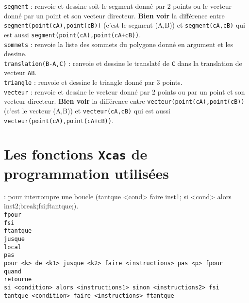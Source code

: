 \documentclass[12pt,a4paper]{book}
\begin{document}
\begin{giacjshere}
{\tt segment}  : renvoie et dessine soit le segment donn\'e par 2 points ou 
le vecteur donn\'e par un point et son vecteur directeur. {\bf Bien voir} la 
diff\'erence entre {\tt segment(point(cA),point(cB))} (c'est le segment (A,B)) 
et {\tt segment(cA,cB)} qui est aussi {\tt segment(point(cA),point(cA+cB))}.\\
{\tt sommets} : renvoie la liste des sommets du polygone donn\'e en argument et les dessine.\\ 
{\tt translation(B-A,C)} : renvoie et dessine le translat\'e de {\tt C} dans la 
translation de vecteur {\tt AB}.\\
{\tt triangle} : renvoie et dessine le triangle donn\'e par 3 points.\\
{\tt vecteur} : renvoie et dessine le vecteur donn\'e par 2 points ou par un 
point et son vecteur directeur. {\bf Bien voir} la 
diff\'erence entre {\tt vecteur(point(cA),point(cB))}(c'est le vecteur (A,B)) et
{\tt vecteur(cA,cB)} qui est aussi {\tt vecteur(point(cA),point(cA+cB))}.
\section{Les fonctions {\tt Xcas} de programmation utilis\'ees}
 : pour interrompre une boucle (tantque <cond> faire inst1; 
si <cond> alors inst2;break;fsi;ftantque;).\\
{\tt fpour}\\
{\tt fsi}\\
{\tt ftantque}\\
{\tt jusque}\\
{\tt local}\\
{\tt pas}\\
{\tt pour <k> de <k1> jusque <k2> faire  <instructions> pas <p> fpour}\\
{\tt quand}\\
{\tt retourne}\\
{\tt si <condition> alors <instructions1> sinon <instructions2> fsi}\\
{\tt tantque <condition> faire  <instructions> ftantque}


\end{giacjshere}
\end{document}
